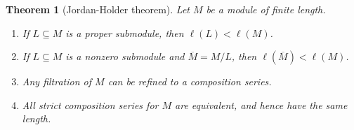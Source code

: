 \documentclass{amsart}[12pt]
\numberwithin{equation}{section}
\theoremstyle{plain} %
\newtheorem{thm}[equation]{Theorem}
\theoremstyle{definition}
\theoremstyle{remark}
\begin{document}
\begin{thm}[Jordan-Holder theorem]
Let $M$ be a module of finite length.
\begin{enumerate}
		\item If $L\subseteq M$ is a proper submodule, then $\ell(L) < \ell(M)$.
		\item If $L\subseteq M$ is a nonzero submodule and $\overline{M}=M/L$, then $\ell(\overline{M})< \ell(M)$.
		\item Any filtration of $M$ can be refined to a composition series.
	\item All strict composition series for $M$ are equivalent, and hence have the same length.
\end{enumerate}
\end{thm}
\end{document}
